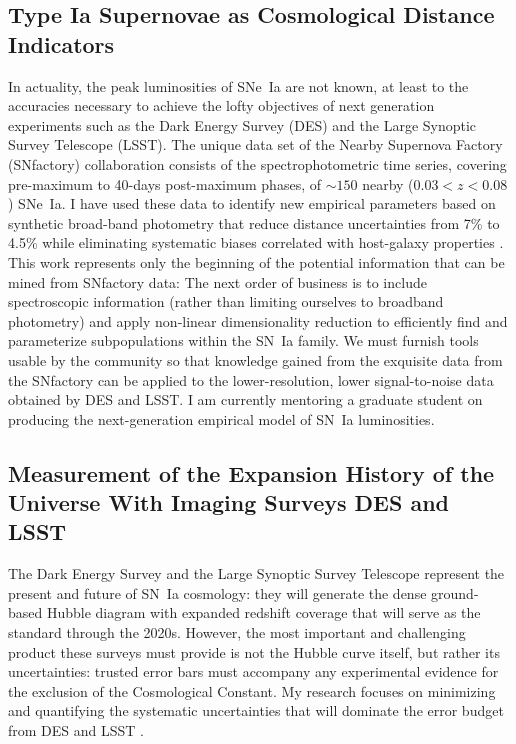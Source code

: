 \documentclass{article}
\begin{document}
\subsection{Type Ia Supernovae as Cosmological Distance Indicators}
In actuality, the peak luminosities of SNe~Ia are not known, at least to the accuracies necessary
to achieve the lofty objectives of next generation experiments such as the Dark Energy Survey (DES) and the Large Synoptic
Survey Telescope (LSST).  The unique data set of
the Nearby Supernova Factory (SNfactory) collaboration consists of the spectrophotometric
time series, covering pre-maximum to 40-days post-maximum phases,
of  $\sim 150$ nearby ($0.03<z<0.08$) SNe~Ia.
I have used these data  to identify new
empirical
parameters based on synthetic broad-band photometry that reduce distance uncertainties from 7\% to 4.5\% \cite{2013ApJ...766...84K}
while eliminating systematic biases correlated with host-galaxy
properties \cite{2014ApJ...784...51K}.  This work represents only the beginning of the
potential information that can be mined from  SNfactory data: The next order of business
is to include spectroscopic information (rather than limiting ourselves to broadband photometry)
and apply non-linear dimensionality reduction to efficiently find and parameterize
subpopulations   within the SN~Ia family.  We must furnish tools usable by the community so that
knowledge gained from the
exquisite data from the SNfactory can be applied to the lower-resolution, lower signal-to-noise data obtained
by DES and LSST.  I am currently mentoring a graduate student on producing the next-generation empirical
model of SN~Ia luminosities.

\subsection{Measurement of the Expansion History of the Universe With Imaging Surveys  DES and LSST}
The Dark Energy Survey and the Large Synoptic Survey Telescope represent the present and future of
SN~Ia cosmology: they
will generate the dense ground-based Hubble diagram with expanded redshift coverage that will serve as the standard 
through the 2020s.  However,
the most important and challenging product these surveys must provide is not the Hubble curve itself,
but rather its uncertainties: trusted error bars must accompany any experimental evidence for the exclusion
of the Cosmological
Constant. My research focuses on
minimizing and quantifying the
systematic uncertainties that will dominate the error budget from DES and LSST \cite{2004MNRAS.347..909K}.  
\end{document}
